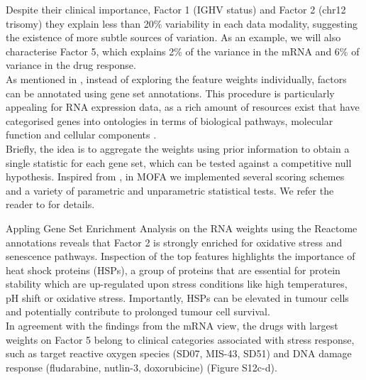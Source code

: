 Despite their clinical importance, Factor 1 (IGHV status) and Factor 2 (chr12 trisomy) they explain less than 20\% variability in each data modality, suggesting the existence of more subtle sources of variation. As an example, we will also characterise Factor 5, which explains 2\% of the variance in the mRNA and 6\% of variance in the drug response.\\
As mentioned in , instead of exploring the feature weights individually, factors can be annotated using gene set annotations. This procedure is particularly appealing for RNA expression data, as a rich amount of resources exist that have categorised genes into ontologies in terms of biological pathways, molecular function and cellular components  \cite{Fabregat2015,Ashburner2000}.\\
Briefly, the idea is to aggregate the weights using prior information to obtain a single statistic for each gene set, which can be tested against a competitive null hypothesis. Inspired from \cite{Frost2015}, in MOFA we implemented several scoring schemes and a variety of parametric and unparametric statistical tests. We refer the reader to \cite{Frost2015} for details.

Appling Gene Set Enrichment Analysis on the RNA weights using the Reactome annotations \cite{Fabregat2015} reveals that Factor 2 is strongly enriched for oxidative stress and senescence pathways. Inspection of the top features highlights the importance of heat shock proteins (HSPs), a group of proteins that are essential for protein stability which are up-regulated upon stress conditions like high temperatures, pH shift or oxidative stress. Importantly, HSPs can be elevated in tumour cells and potentially contribute to prolonged tumour cell survival\cite{Dempsey2010}.\\
In agreement with the findings from the mRNA view, the drugs with largest weights on Factor 5 belong to clinical categories associated with stress response, such as target reactive oxygen species (SD07, MIS-43, SD51) and DNA damage response (fludarabine, nutlin-3, doxorubicine) (Figure S12c-d).


